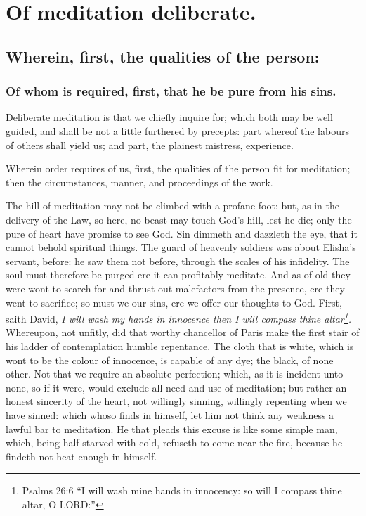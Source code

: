\chapter{Of meditation deliberate.}

\section{Wherein, first, the qualities of the person:}
\subsection{Of whom is required, first, that he be pure from his sins.}

Deliberate meditation is that we chiefly inquire for; which both may be well guided, and shall be not a little furthered by precepts: part whereof the labours of others shall yield us; and part, the plainest mistress, experience. 

Wherein order requires of us, first, the qualities of the person fit for meditation; then the circumstances, manner, and proceedings of the work. 

The hill of meditation may not be climbed with a profane foot: but, as in the delivery of the Law, so here, no beast may touch God's hill, lest he die; only the pure of heart have promise to see God. Sin dimmeth and dazzleth the eye, that it cannot behold spiritual things. The guard of heavenly soldiers was about Elisha's servant, before: he saw them not before, through the scales of his infidelity. The soul must therefore be purged ere it can profitably meditate. And as of old they were wont to search for and thrust out malefactors from the presence, ere they went to sacrifice; so must we our sins, ere we offer our thoughts to God. First, saith David, \emph{I will wash my hands in innocence then I will compass thine altar\footnote{Psalms 26:6 ``I will wash mine hands in innocency: so will I compass thine altar, O LORD:''}.} Whereupon, not unfitly, did that worthy chancellor of Paris make the first stair of his ladder of contemplation humble repentance. The cloth that is white, which is wont to be the colour of innocence, is capable of any dye; the black, of none other. Not that we require an absolute perfection; which, as it is incident unto none, so if it were, would exclude all need and use of meditation; but rather an honest sincerity of the heart, not willingly sinning, willingly repenting when we have sinned: which whoso finds in himself, let him not think any weakness a lawful bar to meditation. He that pleads this excuse is like some simple man, which, being half starved with cold, refuseth to come near the fire, because he findeth not heat enough in himself. 

